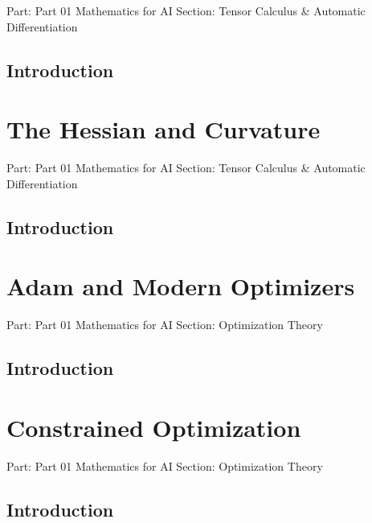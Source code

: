 \documentclass[11pt,a4paper,twoside]{book}
\begin{document}
Part: Part 01 Mathematics for AI Section: Tensor Calculus \& Automatic
Differentiation

\hypertarget{introduction}{%
\subsection{Introduction}\label{introduction}}


\newpage

\hypertarget{the-hessian-and-curvature}{%
\section{The Hessian and Curvature}\label{the-hessian-and-curvature}}

Part: Part 01 Mathematics for AI Section: Tensor Calculus \& Automatic
Differentiation

\hypertarget{introduction}{%
\subsection{Introduction}\label{introduction}}


\newpage

\hypertarget{adam-and-modern-optimizers}{%
\section{Adam and Modern Optimizers}\label{adam-and-modern-optimizers}}

Part: Part 01 Mathematics for AI Section: Optimization Theory

\hypertarget{introduction}{%
\subsection{Introduction}\label{introduction}}


\newpage

\hypertarget{constrained-optimization}{%
\section{Constrained Optimization}\label{constrained-optimization}}

Part: Part 01 Mathematics for AI Section: Optimization Theory

\hypertarget{introduction}{%
\subsection{Introduction}\label{introduction}}
\end{document}

